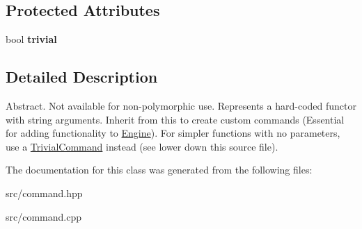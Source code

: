 \subsection*{Protected Attributes}
\begin{DoxyCompactItemize}
\item 
\mbox{\label{class_command_ad6a6005f8236039804a33e9b85dcb7b3}} 
bool {\bfseries trivial}
\end{DoxyCompactItemize}


\subsection{Detailed Description}
Abstract. Not available for non-\/polymorphic use. Represents a hard-\/coded functor with string arguments. Inherit from this to create custom commands (Essential for adding functionality to \mbox{\hyperlink{class_engine}{Engine}}). For simpler functions with no parameters, use a \mbox{\hyperlink{class_trivial_command}{Trivial\+Command}} instead (see lower down this source file). 

The documentation for this class was generated from the following files\+:\begin{DoxyCompactItemize}
\item 
src/command.\+hpp\item 
src/command.\+cpp\end{DoxyCompactItemize}
